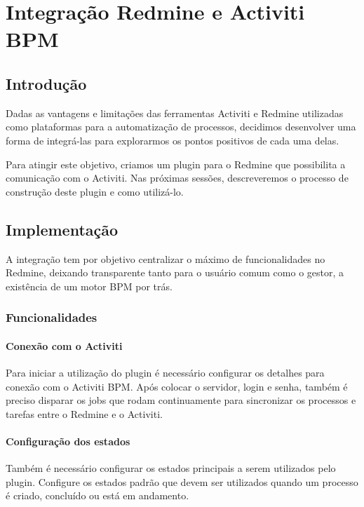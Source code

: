\chapter{Integração Redmine e Activiti BPM}\label{chp:integracao_redmine_activiti}

\section{Introdução}\label{sec:integracao_redmine_activiti-introducao}
Dadas as vantagens e limitações das ferramentas Activiti e Redmine utilizadas como plataformas para a automatização de processos, decidimos desenvolver uma forma de integrá-las para explorarmos os pontos positivos de cada uma delas.

Para atingir este objetivo, criamos um plugin para o Redmine que possibilita a comunicação com o Activiti. Nas próximas sessões, descreveremos o processo de construção deste plugin e como utilizá-lo.


\section{Implementação}\label{sec:integracao_redmine_activiti-implementacao}

A integração tem por objetivo centralizar o máximo de funcionalidades no Redmine, deixando transparente tanto para o usuário comum como o gestor, a existência de um motor BPM por trás.

\subsection{Funcionalidades}\label{sec:integracao_redmine_activiti_implementacao_funcionalidades}

\subsubsection{Conexão com o Activiti }\label{sec:integracao_redmine_activiti_inplementacao_funcionalidades_conexão}
Para iniciar a utilização do plugin é necessário configurar os detalhes para conexão com o Activiti BPM.
Após colocar o servidor, login e senha, também é preciso disparar os jobs que rodam continuamente para sincronizar os processos e tarefas entre o Redmine e o Activiti.

\subsubsection{Configuração dos estados}\label{sec:integracao_redmine_activiti_inplementacao_funcionalidades_conexão}
Também é necessário configurar os estados principais a serem utilizados pelo plugin.
Configure os estados padrão que devem ser utilizados quando um processo é criado, concluído ou está em andamento.

